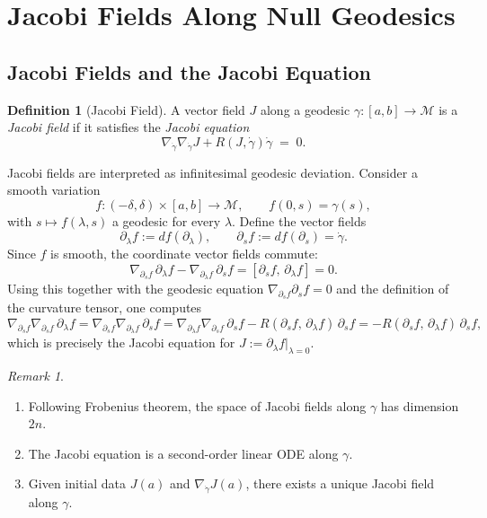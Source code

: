 \documentclass[12pt, a4paper]{article}
\theoremstyle{plain}
\theoremstyle{definition}
\newtheorem{definition}[theorem]{Definition}
\theoremstyle{remark}
\newtheorem{remark}[theorem]{Remark}
\newcommand{\M}{\mathcal{M}}
\begin{document}
\section{Jacobi Fields Along Null Geodesics}

\subsection{Jacobi Fields and the Jacobi Equation}

\begin{definition}[Jacobi Field]
  A vector field $J$ along a geodesic $\gamma \colon [a,b] \to \M$ is a
  \emph{Jacobi field} if it satisfies the \emph{Jacobi equation}
  \[
    \nabla_{\dot{\gamma}}\nabla_{\dot{\gamma}} J + R(J, \dot{\gamma})\dot{\gamma} \;=\; 0.
  \]
\end{definition}

Jacobi fields are interpreted as infinitesimal geodesic deviation. Consider a smooth variation
\[
  f \colon (-\delta, \delta) \times [a, b] \longrightarrow \M, \qquad f(0, s) = \gamma(s),
\]
with $s \mapsto f(\lambda, s)$ a geodesic for every $\lambda$. Define the vector fields
\[
  \partial_\lambda f := df(\partial_\lambda), \qquad \partial_s f := df(\partial_s) = \dot{\gamma}.
\]
Since $f$ is smooth, the coordinate vector fields commute:
\[
  \nabla_{\partial_s f}\,\partial_\lambda f - \nabla_{\partial_\lambda f}\,\partial_s f
  = [\partial_s f,\, \partial_\lambda f] = 0.
\]
Using this together with the geodesic equation $\nabla_{\partial_s f}\partial_s f = 0$ and the definition of the curvature tensor, one computes
\[
  \nabla_{\partial_s f}\nabla_{\partial_s f}\,\partial_\lambda f
  = \nabla_{\partial_s f}\nabla_{\partial_\lambda f}\,\partial_s f
  = \nabla_{\partial_\lambda f}\nabla_{\partial_s f}\,\partial_s f - R(\partial_s f,\, \partial_\lambda f)\,\partial_s f
  = - R(\partial_s f,\, \partial_\lambda f)\,\partial_s f,
\]
which is precisely the Jacobi equation for $J := \partial_\lambda f\big|_{\lambda=0}$.

\begin{remark}
  \begin{enumerate}
    \item Following Frobenius theorem, the space of Jacobi fields along $\gamma$ has dimension $2n$.
    \item The Jacobi equation is a second-order linear ODE along $\gamma$.
    \item Given initial data $J(a)$ and $\nabla_{\dot{\gamma}} J(a)$, there exists a unique Jacobi field along $\gamma$.
  \end{enumerate}
\end{remark}
\end{document}
